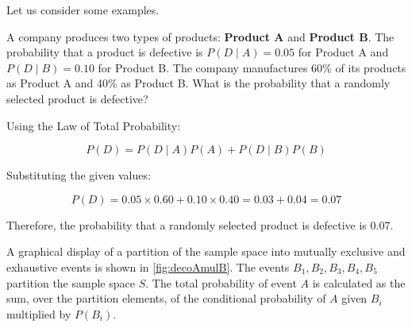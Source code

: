 Let us consider some examples.

\begin{example}
    A company produces two types of products: \textbf{Product A} and \textbf{Product B}. The probability that a product is defective is \( P(D \mid A) = 0.05 \) for Product A and \( P(D \mid B) = 0.10 \) for Product B. The company manufactures 60\% of its products as Product A and 40\% as Product B. What is the probability that a randomly selected product is defective?
\end{example}

\begin{solution}
    Using the Law of Total Probability:

    \[
    P(D) = P(D \mid A) P(A) + P(D \mid B) P(B)
    \]

    Substituting the given values:

    \[
    P(D) = 0.05 \times 0.60 + 0.10 \times 0.40 = 0.03 + 0.04 = 0.07
    \]

    Therefore, the probability that a randomly selected product is defective is 0.07.
\leavevmode\end{solution}

A graphical display of a partition of the sample space into mutually exclusive and exhaustive events is shown in \autoref{fig:decoAmulB}. The events \( B_1, B_2, B_3, B_4, B_5 \) partition the sample space \( S \). The total probability of event \( A \) is calculated as the sum, over the partition elements, of the conditional probability of \(A\) given \(B_i\) multiplied by \(P(B_i)\).

